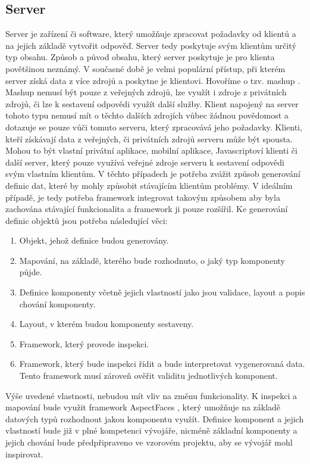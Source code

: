 \subsection{Server}
Server je zařízení či software, který umožňuje zpracovat požadavky od klientů a na jejich základě vytvořit odpověď. Server tedy poskytuje svým klientům určitý typ obsahu. Způsob a původ obsahu, který server poskytuje je pro klienta povětšinou neznámý. V současné době je velmi populární přístup, při kterém server získá data z více zdrojů a poskytne je klientovi. Hovoříme o tzv. mashup \cite{Tuchinda2008}. Mashup nemusí být pouze z veřejných zdrojů, lze využít i zdroje z privátních zdrojů, či lze k sestavení odpovědi využít další služby. Klient napojený na server tohoto typu nemusí mít o těchto dalších zdrojích vůbec žádnou povědomost a dotazuje se pouze vůči tomuto serveru, který zpracovává jeho požadavky. 
Klienti, kteří získávají data z veřejných, či privátních zdrojů serveru může být spousta. Mohou to být vlastní privátní aplikace, mobilní aplikace, Javascriptoví klienti či další server, který pouze využívá veřejné zdroje serveru k sestavení odpovědi svým vlastním klientům. V těchto případech je potřeba zvážit způsob generování definic dat, které by mohly způsobit stávajícím klientům problémy. V ideálním případě, je tedy potřeba framework integrovat takovým způsobem aby byla zachována stávající funkcionalita a framework ji pouze rozšířil. 
Ke generování definic objektů jsou potřeba následující věci:
\begin{enumerate}
\item Objekt, jehož definice budou generovány.
\item Mapování, na základě, kterého bude rozhodnuto, o jaký typ komponenty půjde.
\item Definice komponenty včetně jejich vlastností jako jsou validace, layout a popis chování komponenty.
\item Layout, v kterém budou komponenty sestaveny.
\item Framework, který provede inspekci.
\item Framework, který bude inspekci řídit a bude interpretovat vygenerovaná data. Tento framework musí zároveň ověřit validitu jednotlivých komponent.
\end{enumerate}

Výše uvedené vlastnosti, nebudou mít vliv na změnu funkcionality. K inspekci a mapování bude využit framework AspectFaces \cite{aspectFaces}, který umožňuje na základě datových typů rozhodnout jakou komponentu využít. Definice komponent a jejich vlastností bude již v plné kompetenci vývojáře, nicméně základní komponenty a jejich chování bude předpřipraveno ve vzorovém projektu, aby se vývojář mohl inspirovat.

